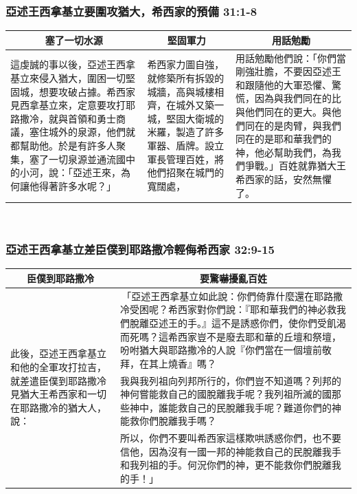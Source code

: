 \subsubsection{亞述王西拿基立要圍攻猶大，希西家的預備 31:1-8}
\begin{table}[H]
\centering
\begin{tabular}{p{6.5cm}|p{}|p{5.5cm}}\hline\hline
\multicolumn{1}{c|}{塞了一切水源}&\multicolumn{1}{c|}{堅固軍力}&\multicolumn{1}{c|}{用話勉勵}\\\hline
這虔誠的事以後，亞述王西拿基立來侵入猶大，圍困一切堅固城，想要攻破占據。希西家見西拿基立來，定意要攻打耶路撒冷，就與首領和勇士商議，塞住城外的泉源，他們就都幫助他。於是有許多人聚集，塞了一切泉源並通流國中的小河，說：「亞述王來，為何讓他得著許多水呢？」 
&希西家力圖自強，就修築所有拆毀的城牆，高與城樓相齊，在城外又築一城，堅固大衛城的米羅，製造了許多軍器、盾牌。設立軍長管理百姓，將他們招聚在城門的寬闊處，
&用話勉勵他們說：「你們當剛強壯膽，不要因亞述王和跟隨他的大軍恐懼、驚慌，因為與我們同在的比與他們同在的更大。與他們同在的是肉臂，與我們同在的是耶和華我們的神，他必幫助我們，為我們爭戰。」百姓就靠猶大王希西家的話，安然無懼了。\\\hline 
\end{tabular}
\end{table} 


\subsubsection{亞述王西拿基立差臣僕到耶路撒冷輕侮希西家 32:9-15}
\begin{table}[H]
\centering
\begin{tabular}{p{}|p{14.5cm}}\hline\hline
\multicolumn{1}{c|}{臣僕到耶路撒冷}&\multicolumn{1}{c}{要驚嚇擾亂百姓}\\\hline
\multirow{3}{3.1cm}{此後，亞述王西拿基立和他的全軍攻打拉吉，就差遣臣僕到耶路撒冷見猶大王希西家和一切在耶路撒冷的猶大人，說：}
& 「亞述王西拿基立如此說：你們倚靠什麼還在耶路撒冷受困呢？希西家對你們說：『耶和華我們的神必救我們脫離亞述王的手。』這不是誘惑你們，使你們受飢渴而死嗎？這希西家豈不是廢去耶和華的丘壇和祭壇，吩咐猶大與耶路撒冷的人說『你們當在一個壇前敬拜，在其上燒香』嗎？\\\cline{2-2}
&我與我列祖向列邦所行的，你們豈不知道嗎？列邦的神何嘗能救自己的國脫離我手呢？我列祖所滅的國那些神中，誰能救自己的民脫離我手呢？難道你們的神能救你們脫離我手嗎？\\\cline{2-2} 
&所以，你們不要叫希西家這樣欺哄誘惑你們，也不要信他，因為沒有一國一邦的神能救自己的民脫離我手和我列祖的手。何況你們的神，更不能救你們脫離我的手！」\\\hline 
\end{tabular}
\end{table} 


